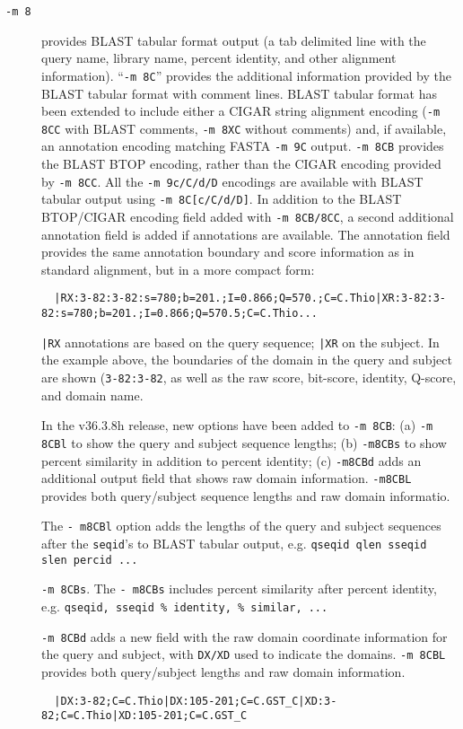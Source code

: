 \documentclass[11pt]{article}
\begin{document}
\begin{description}
\item[\texttt{-m 8}] provides BLAST tabular format output (a tab
  delimited line with the query name, library name, percent identity,
  and other alignment information). ``\texttt{-m 8C}'' provides the
  additional information provided by the BLAST tabular format with
  comment lines.  BLAST tabular format has been extended to include
  either a CIGAR string alignment encoding (\texttt{-m 8CC} with BLAST
  comments, \texttt{-m 8XC} without comments) and, if available, an
  annotation encoding matching FASTA \texttt{-m 9C} output. \texttt{-m
    8CB} provides the BLAST BTOP encoding, rather than the CIGAR
  encoding provided by \texttt{-m 8CC}.  All the \texttt{-m 9c/C/d/D}
  encodings are available with BLAST tabular output using \texttt{-m
    8C[c/C/d/D]}.  In addition to the BLAST BTOP/CIGAR encoding field
  added with \texttt{-m 8CB/8CC}, a second additional annotation field is added if annotations are available. The annotation field provides the same annotation boundary and score information as in standard alignment, but in a more compact form:
\begin{verbatim}
  |RX:3-82:3-82:s=780;b=201.;I=0.866;Q=570.;C=C.Thio|XR:3-82:3-82:s=780;b=201.;I=0.866;Q=570.5;C=C.Thio...
\end{verbatim}
  \texttt{|RX} annotations are based on the query sequence; \texttt{|XR} on the subject. In the example above, the boundaries of the domain in the query and subject are shown (\texttt{3-82:3-82}, as well as the raw score, bit-score, identity, Q-score, and domain name.

  In the v36.3.8h release, 
  new options have been added to \texttt{-m 8CB}: (a) \texttt{-m 8CBl} to show the query and subject sequence lengths;
  (b) \texttt{-m8CBs} to show percent similarity in addition to percent identity; (c) \texttt{-m8CBd} adds an additional output field that shows raw domain information. \texttt{-m8CBL} provides both query/subject sequence lengths and raw domain informatio.

 The \texttt{- m8CBl} option adds the lengths of
  the query and subject sequences after the \texttt{seqid}'s to BLAST
  tabular output, e.g. \texttt{qseqid qlen sseqid slen percid ...}

  \texttt{-m 8CBs}. The \texttt{- m8CBs} includes percent similarity after percent identity,
  e.g. \texttt{qseqid, sseqid \% identity, \% similar, ... }

  \texttt{-m 8CBd} adds a new field with
  the raw domain coordinate information for the query and subject, with \texttt{DX/XD} used to indicate the domains.
  \texttt{-m 8CBL} provides both query/subject lengths and raw domain information.
\begin{verbatim}
  |DX:3-82;C=C.Thio|DX:105-201;C=C.GST_C|XD:3-82;C=C.Thio|XD:105-201;C=C.GST_C
\end{verbatim}


\end{description}
\end{document}
